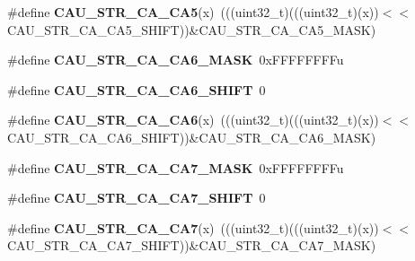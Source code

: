 \begin{DoxyCompactItemize}
\item 
\#define {\bfseries C\+A\+U\+\_\+\+S\+T\+R\+\_\+\+C\+A\+\_\+\+C\+A5}(x)~(((uint32\+\_\+t)(((uint32\+\_\+t)(x))$<$$<$C\+A\+U\+\_\+\+S\+T\+R\+\_\+\+C\+A\+\_\+\+C\+A5\+\_\+\+S\+H\+I\+FT))\&C\+A\+U\+\_\+\+S\+T\+R\+\_\+\+C\+A\+\_\+\+C\+A5\+\_\+\+M\+A\+SK)\hypertarget{group__CAU__Register__Masks_gacaee31158c7c88a14f80a244364c9128}{}\label{group__CAU__Register__Masks_gacaee31158c7c88a14f80a244364c9128}

\item 
\#define {\bfseries C\+A\+U\+\_\+\+S\+T\+R\+\_\+\+C\+A\+\_\+\+C\+A6\+\_\+\+M\+A\+SK}~0x\+F\+F\+F\+F\+F\+F\+F\+Fu\hypertarget{group__CAU__Register__Masks_ga7b5a1caf333ef375bf06cd83702a2f52}{}\label{group__CAU__Register__Masks_ga7b5a1caf333ef375bf06cd83702a2f52}

\item 
\#define {\bfseries C\+A\+U\+\_\+\+S\+T\+R\+\_\+\+C\+A\+\_\+\+C\+A6\+\_\+\+S\+H\+I\+FT}~0\hypertarget{group__CAU__Register__Masks_ga2d6d9fbc55d31a3abf405b19663984fd}{}\label{group__CAU__Register__Masks_ga2d6d9fbc55d31a3abf405b19663984fd}

\item 
\#define {\bfseries C\+A\+U\+\_\+\+S\+T\+R\+\_\+\+C\+A\+\_\+\+C\+A6}(x)~(((uint32\+\_\+t)(((uint32\+\_\+t)(x))$<$$<$C\+A\+U\+\_\+\+S\+T\+R\+\_\+\+C\+A\+\_\+\+C\+A6\+\_\+\+S\+H\+I\+FT))\&C\+A\+U\+\_\+\+S\+T\+R\+\_\+\+C\+A\+\_\+\+C\+A6\+\_\+\+M\+A\+SK)\hypertarget{group__CAU__Register__Masks_ga2ec9833172e8d38e73afcb75f0e7763a}{}\label{group__CAU__Register__Masks_ga2ec9833172e8d38e73afcb75f0e7763a}

\item 
\#define {\bfseries C\+A\+U\+\_\+\+S\+T\+R\+\_\+\+C\+A\+\_\+\+C\+A7\+\_\+\+M\+A\+SK}~0x\+F\+F\+F\+F\+F\+F\+F\+Fu\hypertarget{group__CAU__Register__Masks_ga71cb093a615f022bab07fea3386b14c4}{}\label{group__CAU__Register__Masks_ga71cb093a615f022bab07fea3386b14c4}

\item 
\#define {\bfseries C\+A\+U\+\_\+\+S\+T\+R\+\_\+\+C\+A\+\_\+\+C\+A7\+\_\+\+S\+H\+I\+FT}~0\hypertarget{group__CAU__Register__Masks_ga438fb9b2bcfb9ce4ff046f9cf3fb12e2}{}\label{group__CAU__Register__Masks_ga438fb9b2bcfb9ce4ff046f9cf3fb12e2}

\item 
\#define {\bfseries C\+A\+U\+\_\+\+S\+T\+R\+\_\+\+C\+A\+\_\+\+C\+A7}(x)~(((uint32\+\_\+t)(((uint32\+\_\+t)(x))$<$$<$C\+A\+U\+\_\+\+S\+T\+R\+\_\+\+C\+A\+\_\+\+C\+A7\+\_\+\+S\+H\+I\+FT))\&C\+A\+U\+\_\+\+S\+T\+R\+\_\+\+C\+A\+\_\+\+C\+A7\+\_\+\+M\+A\+SK)\hypertarget{group__CAU__Register__Masks_gadbfbc657f2fb34b2788cf7ebda86238e}{}\label{group__CAU__Register__Masks_gadbfbc657f2fb34b2788cf7ebda86238e}


\end{DoxyCompactItemize}
